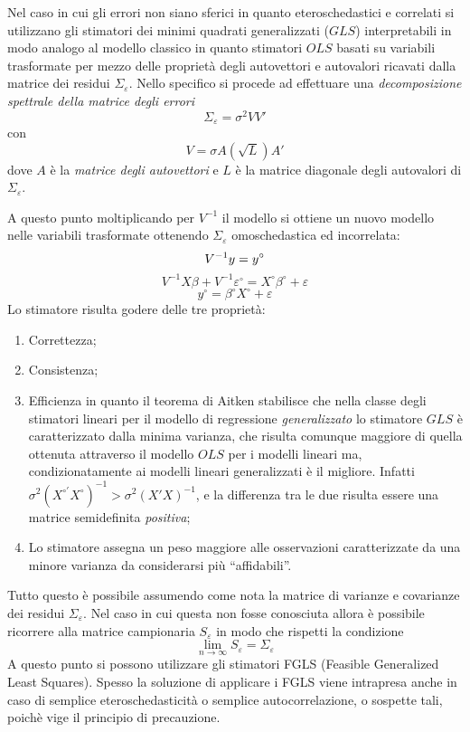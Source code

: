 \documentclass[a4page, 11pt]{article} %
\begin{document}
Nel caso in cui gli errori non siano sferici in quanto eteroschedastici e correlati si utilizzano gli stimatori dei minimi quadrati generalizzati ($GLS$) interpretabili in modo analogo al modello classico in quanto stimatori $OLS$ basati su variabili trasformate per mezzo delle proprietà degli autovettori e autovalori ricavati dalla matrice dei residui $\Sigma_\varepsilon$.
Nello specifico si procede ad effettuare una \textit{decomposizione spettrale della matrice degli errori} 
\[
\Sigma_\varepsilon = \sigma^2 VV'
\]
con
\[
V = \sigma A(\sqrt{L})A'
\]
dove $A$ è la \textit{matrice degli autovettori} e $L$ è la matrice diagonale degli autovalori di $\Sigma_\varepsilon$.

A questo punto moltiplicando per $V^{-1}$ il modello si ottiene un nuovo modello nelle variabili trasformate ottenendo $\Sigma_\varepsilon$ omoschedastica ed incorrelata:
\begin{equation*}
V^{-1}y = y^\circ \\
\end{equation*}
\begin{equation*}
V^{-1}X\beta + V^{-1}\varepsilon^\circ = X^\circ\beta^\circ + \varepsilon
\end{equation*}
\begin{equation*}
y^\circ = \beta^\circ X^\circ + \varepsilon
\end{equation*}
Lo stimatore risulta godere delle tre proprietà:
\begin{enumerate}[noitemsep]
\item Correttezza;
\item Consistenza;
\item Efficienza in quanto il teorema di Aitken stabilisce che nella classe degli stimatori lineari per il modello di regressione \textit{generalizzato} lo stimatore $GLS$ è caratterizzato dalla minima varianza, che risulta comunque maggiore di quella ottenuta attraverso il modello $OLS$ per i modelli lineari ma, condizionatamente ai modelli lineari generalizzati è il migliore. Infatti $\sigma^2 (X^{\circ '}X^{\circ})^{-1} >\sigma^2 (X'X)^{-1}$, e la differenza tra le due risulta essere una matrice semidefinita \textit{positiva};
\item Lo stimatore assegna un peso maggiore alle osservazioni caratterizzate da una minore varianza da considerarsi più ``affidabili''.
\end{enumerate}
Tutto questo è possibile assumendo come nota la matrice di varianze e covarianze dei residui $\Sigma_\varepsilon$. Nel caso in cui questa non fosse conosciuta allora è possibile ricorrere alla matrice campionaria $S_\varepsilon$ in modo che rispetti la condizione 
\[
\lim_{n\to \infty}{S_\varepsilon = \Sigma_\varepsilon}
\]
 A questo punto si possono utilizzare gli stimatori FGLS (Feasible Generalized Least Squares). Spesso la soluzione di applicare i FGLS viene intrapresa anche in caso di semplice eteroschedasticità o semplice autocorrelazione, o sospette tali, poichè vige il principio di precauzione.
\end{document}
